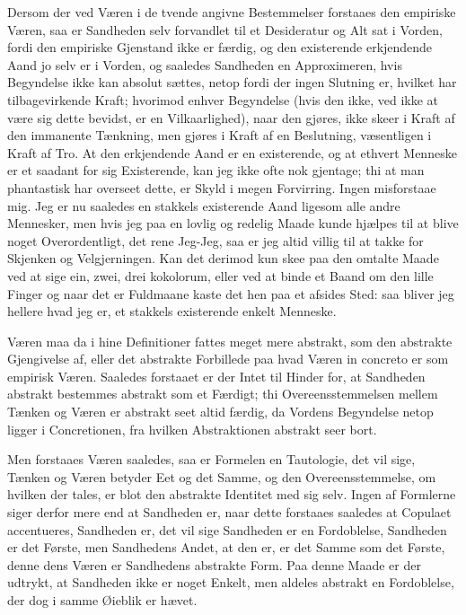 \documentclass[12pt,a4paper]{article}
\begin{document}
Dersom der ved Væren i de tvende angivne Bestemmelser forstaaes den empiriske Væren, saa er Sandheden selv forvandlet til et Desideratur og Alt sat i Vorden, fordi den empiriske Gjenstand ikke er færdig, og den existerende erkjendende Aand jo selv er i Vorden, og saaledes Sandheden en Approximeren, hvis Begyndelse ikke kan absolut sættes, netop fordi der ingen Slutning er, hvilket har tilbagevirkende Kraft; hvorimod enhver Begyndelse (hvis den ikke, ved ikke at være sig dette bevidst, er en Vilkaarlighed), naar den gjøres, ikke skeer i Kraft af den immanente Tænkning, men gjøres i Kraft af en Beslutning, væsentligen i Kraft af Tro. At den erkjendende Aand er en existerende, og at ethvert Menneske er et saadant for sig Existerende, kan jeg ikke ofte nok gjentage; thi at man phantastisk har overseet dette, er Skyld i megen Forvirring. Ingen misforstaae mig. Jeg er nu saaledes en stakkels existerende Aand ligesom alle andre Mennesker, men hvis jeg paa en lovlig og redelig Maade kunde hjælpes til at blive noget Overordentligt, det rene Jeg-Jeg, saa er jeg altid villig til at takke for Skjenken og Velgjerningen. Kan det derimod kun skee paa den omtalte Maade ved at sige ein, zwei, drei kokolorum, eller ved at binde et Baand om den lille Finger og naar det er Fuldmaane kaste det hen paa et afsides Sted: saa bliver jeg hellere hvad jeg er, et stakkels existerende enkelt Menneske.

Væren maa da i hine Definitioner fattes meget mere abstrakt, som den abstrakte Gjengivelse af, eller det abstrakte Forbillede paa hvad Væren in concreto er som empirisk Væren. Saaledes forstaaet er der Intet til Hinder for, at Sandheden abstrakt bestemmes abstrakt som et Færdigt; thi Overeensstemmelsen mellem Tænken og Væren er abstrakt seet altid færdig, da Vordens Begyndelse netop ligger i Concretionen, fra hvilken Abstraktionen abstrakt seer bort.

Men forstaaes Væren saaledes, saa er Formelen en Tautologie, det vil sige, Tænken og Væren betyder Eet og det Samme, og den Overeensstemmelse, om hvilken der tales, er blot den abstrakte Identitet med sig selv. Ingen af Formlerne siger derfor mere end at Sandheden er, naar dette forstaaes saaledes at Copulaet accentueres, Sandheden er, det vil sige Sandheden er en Fordoblelse, Sandheden er det Første, men Sandhedens Andet, at den er, er det Samme som det Første, denne dens Væren er Sandhedens abstrakte Form. Paa denne Maade er der udtrykt, at Sandheden ikke er noget Enkelt, men aldeles abstrakt en Fordoblelse, der dog i samme Øieblik er hævet.
\end{document}
